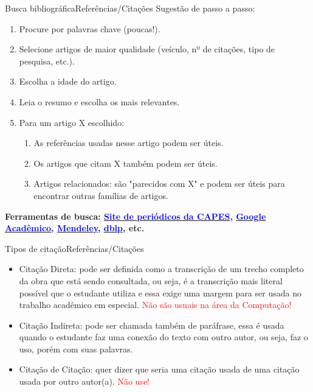 \documentclass[t]{beamer}
\begin{document}


\begin{ftst}{Busca bibliográfica}{Referências/Citações}
\justifying
Sugestão de passo a passo:
\begin{enumerate}
    \item Procure por palavras chave (poucas!).

    \item Selecione artigos de maior qualidade (veículo, nº de citações, tipo de pesquisa, etc.).

    \item Escolha a idade do artigo.

    \item Leia o resumo e escolha os mais relevantes.
    \item Para um artigo X escolhido:
    \begin{enumerate}
        \item As referências usadas nesse artigo podem ser úteis.
        \item Os artigos que citam X também podem ser úteis.
        \item Artigos relacionados: são "parecidos com X" e podem ser úteis para encontrar outras famílias de artigos.
    \end{enumerate}
\end{enumerate}
\vone
\small
\textbf{Ferramentas de busca: \href{https://www-periodicos-capes-gov-br.ezl.periodicos.capes.gov.br/index.php?}{\textcolor{blue}{Site de periódicos da CAPES}}, \href{https://scholar.google.com.br/?hl=pt}{\textcolor{blue}{Google Acadêmico}}, \href{https://www.mendeley.com/}{\textcolor{blue}{Mendeley}}, \href{https://dblp.org/}{\textcolor{blue}{dblp}}, etc.}

\end{ftst}



\begin{ftst}{Tipos de citação}{Referências/Citações}
\justifying

\begin{itemize}
    \item Citação Direta: pode ser definida como a transcrição de um trecho completo da obra que está sendo consultada, ou seja, é a transcrição mais literal possível que o estudante utiliza e essa exige uma margem para ser usada no trabalho acadêmico em especial. \textcolor{red}{Não são usuais na área da Computação!}
    \vone
    \item Citação Indireta: pode ser chamada também de paráfrase, essa é usada quando o estudante faz uma conexão do texto com outro autor, ou seja, faz o uso, porém com suas palavras.
    \vone
    \item Citação de Citação: quer dizer que seria uma citação usada de uma citação usada por outro autor(a). \textcolor{red}{Não use!}
\end{itemize}
\end{ftst}
\end{document}
